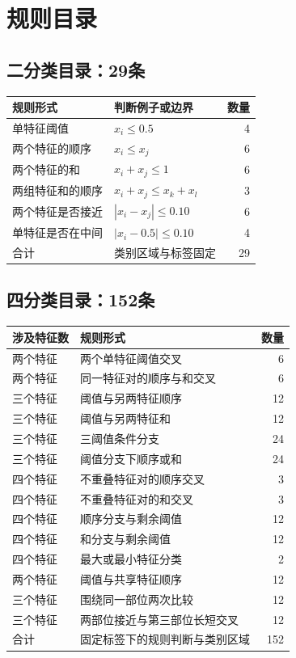\documentclass[11pt,a4paper]{article}
\numberwithin{equation}{section}
\begin{document}
\section{规则目录}
\label{app:catalogue}

\subsection{二分类目录：29条}
{\small\noindent
\begin{tabularx}{\linewidth}{L{4.4cm}Yr}
\toprule
规则形式 & 判断例子或边界 & 数量\\
\midrule
单特征阈值 & $x_i\leq0.5$ & 4\\
两个特征的顺序 & $x_i\leq x_j$ & 6\\
两个特征的和 & $x_i+x_j\leq1$ & 6\\
两组特征和的顺序 & $x_i+x_j\leq x_k+x_l$ & 3\\
两个特征是否接近 & $|x_i-x_j|\leq0.10$ & 6\\
单特征是否在中间 & $|x_i-0.5|\leq0.10$ & 4\\
\midrule
合计 & 类别区域与标签固定 & 29\\
\bottomrule
\end{tabularx}}

\subsection{四分类目录：152条}
{\small
\begin{longtable}{L{2.6cm}L{11.1cm}r}
\toprule
涉及特征数 & 规则形式 & 数量\\
\midrule\endhead
两个特征 & 两个单特征阈值交叉 & 6\\
两个特征 & 同一特征对的顺序与和交叉 & 6\\
三个特征 & 阈值与另两特征顺序 & 12\\
三个特征 & 阈值与另两特征和 & 12\\
三个特征 & 三阈值条件分支 & 24\\
三个特征 & 阈值分支下顺序或和 & 24\\
四个特征 & 不重叠特征对的顺序交叉 & 3\\
四个特征 & 不重叠特征对的和交叉 & 3\\
四个特征 & 顺序分支与剩余阈值 & 12\\
四个特征 & 和分支与剩余阈值 & 12\\
四个特征 & 最大或最小特征分类 & 2\\
两个特征 & 阈值与共享特征顺序 & 12\\
三个特征 & 围绕同一部位两次比较 & 12\\
三个特征 & 两部位接近与第三部位长短交叉 & 12\\
\midrule
合计 & 固定标签下的规则判断与类别区域 & 152\\
\bottomrule
\end{longtable}}
\end{document}
